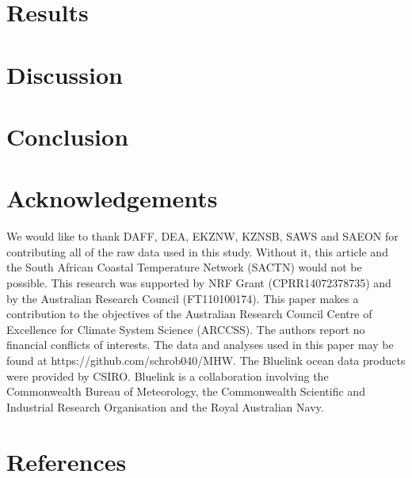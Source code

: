 \documentclass[a4paper,10pt,review]{elsarticle}
\begin{document}
\section{Results}

\section{Discussion}

\section{Conclusion}

\section*{Acknowledgements}
We would like to thank DAFF, DEA, EKZNW, KZNSB, SAWS and SAEON for contributing all of the raw data used in this study. Without it, this article and the South African Coastal Temperature Network (SACTN) would not be possible. This research was supported by NRF Grant (CPRR14072378735) and by the Australian Research Council (FT110100174). This paper makes a contribution to the objectives of the Australian Research Council Centre of Excellence for Climate System Science (ARCCSS). The authors report no financial conflicts of interests. The data and analyses used in this paper may be found at https://github.com/schrob040/MHW. The Bluelink ocean data products were provided by CSIRO. Bluelink is a collaboration involving the Commonwealth Bureau of Meteorology, the Commonwealth Scientific and Industrial Research Organisation and the Royal Australian Navy.

\section*{References}





\end{document}
